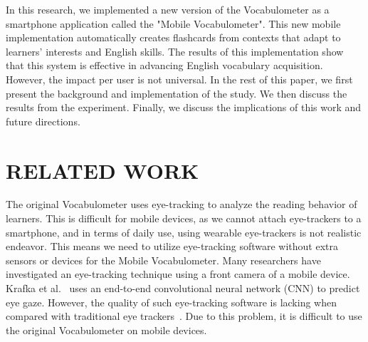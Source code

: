 \documentclass[sigchi]{acmart}
\begin{document}
In this research, we implemented a new version of the Vocabulometer as a smartphone application called the "Mobile Vocabulometer". This new mobile implementation automatically creates flashcards from contexts that adapt to learners' interests and English skills. The results of this implementation show that this system is effective in advancing English vocabulary acquisition. However, the impact per user is not universal. In the rest of this paper, we first present the background and implementation of the study. We then discuss the results from the experiment. Finally, we discuss the implications of this work and future directions. 
\begin{comment}
\begin{figure*}[!t]
    \centering
    \texttt{[image: ./fig/architecture.eps]}
    \caption{Application Architecture}
    \label{fig:config}
\end{figure*}
\end{comment}
\section{RELATED WORK}
The original Vocabulometer uses eye-tracking to analyze the reading behavior of learners. This is difficult for mobile devices, as we cannot attach eye-trackers to a smartphone, and in terms of daily use, using wearable eye-trackers is not realistic endeavor. This means we need to utilize eye-tracking software without extra sensors or devices for the Mobile Vocabulometer. Many researchers have investigated an eye-tracking technique using a front camera of a mobile device. Krafka et al.~\cite{krafka2016eye} uses an end-to-end convolutional neural network (CNN) to predict eye gaze. However, the quality of such eye-tracking software is lacking when compared with traditional eye trackers~\cite{feit2017toward}. Due to this problem, it is difficult to use the original Vocabulometer on mobile devices.
\begin{comment}
Guo et al.~\cite{guo2018understanding} use the periodic literal eye movement patterns to predict which line the user looks instead of gaze fixations to achieve high accuracy of estimation. Furthermore, they are able to extract some features related to comprehension, concentration, confidence, and engagement. 


There is also significant investigations into the efficacy of flashcards. For example, Nayak et al.~\cite{Nayak2017vocab} focused on the testing effect for long term retention. They developed a flashcard application that implements short answer based tests. Settles et al.~\cite{settles2016trainable} focused on the spaced repetition algorithm for reminding unknown words at a certain timing. 
\end{comment}
\end{document}
